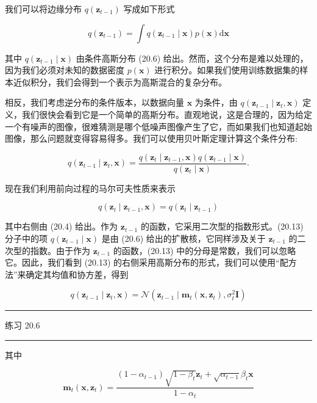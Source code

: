 \documentclass[10pt]{report}
\newcommand{\HRule}{\begin{center}\rule{0.9\linewidth}{0.2mm}\end{center}}
\begin{document}
我们可以将边缘分布 \(q\left( {\mathbf{z}}_{t - 1}\right)\) 写成如下形式

\[
q\left( {\mathbf{z}}_{t - 1}\right)  = \int q\left( {{\mathbf{z}}_{t - 1} \mid  \mathbf{x}}\right) p\left( \mathbf{x}\right) \mathrm{d}\mathbf{x} \tag{20.12}
\]

其中 \(q\left( {{\mathbf{z}}_{t - 1} \mid  \mathbf{x}}\right)\) 由条件高斯分布 (20.6) 给出。然而，这个分布是难以处理的，因为我们必须对未知的数据密度 \(p\left( \mathbf{x}\right)\) 进行积分。如果我们使用训练数据集的样本近似积分，我们会得到一个表示为高斯混合的复杂分布。

相反，我们考虑逆分布的条件版本，以数据向量 \(\mathbf{x}\) 为条件，由 \(q\left( {{\mathbf{z}}_{t - 1} \mid  {\mathbf{z}}_{t},\mathbf{x}}\right)\) 定义，我们很快会看到它是一个简单的高斯分布。直观地说，这是合理的，因为给定一个有噪声的图像，很难猜测是哪个低噪声图像产生了它，而如果我们也知道起始图像，那么问题就变得容易得多。我们可以使用贝叶斯定理计算这个条件分布:

\[
q\left( {{\mathbf{z}}_{t - 1} \mid  {\mathbf{z}}_{t},\mathbf{x}}\right)  = \frac{q\left( {{\mathbf{z}}_{t} \mid  {\mathbf{z}}_{t - 1},\mathbf{x}}\right) q\left( {{\mathbf{z}}_{t - 1} \mid  \mathbf{x}}\right) }{q\left( {{\mathbf{z}}_{t} \mid  \mathbf{x}}\right) }. \tag{20.13}
\]

现在我们利用前向过程的马尔可夫性质来表示

\[
q\left( {{\mathbf{z}}_{t} \mid  {\mathbf{z}}_{t - 1},\mathbf{x}}\right)  = q\left( {{\mathbf{z}}_{t} \mid  {\mathbf{z}}_{t - 1}}\right)  \tag{20.14}
\]

其中右侧由 (20.4) 给出。作为 \({\mathbf{z}}_{t - 1}\) 的函数，它采用二次型的指数形式。(20.13) 分子中的项 \(q\left( {{\mathbf{z}}_{t - 1} \mid  \mathbf{x}}\right)\) 是由 (20.6) 给出的扩散核，它同样涉及关于 \({\mathbf{z}}_{t - 1}\) 的二次型的指数。由于作为 \({\mathbf{z}}_{t - 1}\) 的函数，(20.13) 中的分母是常数，我们可以忽略它。因此，我们看到 (20.13) 的右侧采用高斯分布的形式，我们可以使用“配方法”来确定其均值和协方差，得到

\[
q\left( {{\mathbf{z}}_{t - 1} \mid  {\mathbf{z}}_{t},\mathbf{x}}\right)  = \mathcal{N}\left( {{\mathbf{z}}_{t - 1} \mid  {\mathbf{m}}_{t}\left( {\mathbf{x},{\mathbf{z}}_{t}}\right) ,{\sigma }_{t}^{2}\mathbf{I}}\right)  \tag{20.15}
\]

\HRule

练习 20.6

\HRule

其中

\[
{\mathbf{m}}_{t}\left( {\mathbf{x},{\mathbf{z}}_{t}}\right)  = \frac{\left( {1 - {\alpha }_{t - 1}}\right) \sqrt{1 - {\beta }_{t}}{\mathbf{z}}_{t} + \sqrt{{\alpha }_{t - 1}}{\beta }_{t}\mathbf{x}}{1 - {\alpha }_{t}} \tag{20.16}
\]
\end{document}
